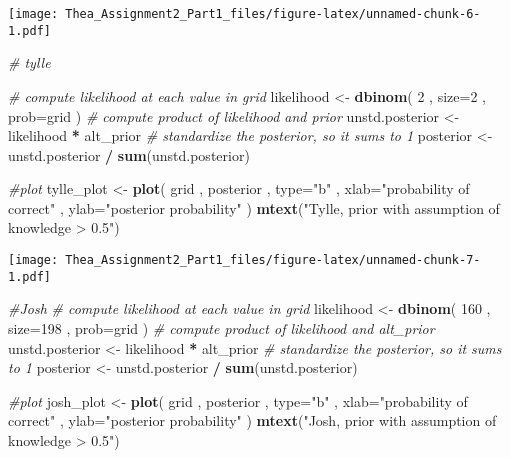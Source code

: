 \documentclass[]{article}
\newenvironment{Shaded}{\begin{snugshade}}{\end{snugshade}}
\newcommand{\KeywordTok}[1]{\textcolor[rgb]{0.13,0.29,0.53}{\textbf{#1}}}
\newcommand{\DataTypeTok}[1]{\textcolor[rgb]{0.13,0.29,0.53}{#1}}
\newcommand{\DecValTok}[1]{\textcolor[rgb]{0.00,0.00,0.81}{#1}}
\newcommand{\StringTok}[1]{\textcolor[rgb]{0.31,0.60,0.02}{#1}}
\newcommand{\CommentTok}[1]{\textcolor[rgb]{0.56,0.35,0.01}{\textit{#1}}}
\newcommand{\OperatorTok}[1]{\textcolor[rgb]{0.81,0.36,0.00}{\textbf{#1}}}
\newcommand{\NormalTok}[1]{#1}
\begin{document}
\texttt{[image: Thea\_Assignment2\_Part1\_files/figure-latex/unnamed-chunk-6-1.pdf]}

\begin{Shaded}
\begin{Highlighting}[]
\CommentTok{# tylle}

\CommentTok{# compute likelihood at each value in grid}
\NormalTok{likelihood <-}\StringTok{ }\KeywordTok{dbinom}\NormalTok{( }\DecValTok{2}\NormalTok{ , }\DataTypeTok{size=}\DecValTok{2}\NormalTok{ , }\DataTypeTok{prob=}\NormalTok{grid )}
\CommentTok{# compute product of likelihood and prior}
\NormalTok{unstd.posterior <-}\StringTok{ }\NormalTok{likelihood }\OperatorTok{*}\StringTok{ }\NormalTok{alt_prior}
\CommentTok{# standardize the posterior, so it sums to 1}
\NormalTok{posterior <-}\StringTok{ }\NormalTok{unstd.posterior }\OperatorTok{/}\StringTok{ }\KeywordTok{sum}\NormalTok{(unstd.posterior)}

\CommentTok{#plot}
\NormalTok{tylle_plot <-}\StringTok{ }\KeywordTok{plot}\NormalTok{( grid , posterior , }\DataTypeTok{type=}\StringTok{"b"}\NormalTok{ ,}
    \DataTypeTok{xlab=}\StringTok{"probability of correct"}\NormalTok{ , }\DataTypeTok{ylab=}\StringTok{"posterior probability"}\NormalTok{ )}
\KeywordTok{mtext}\NormalTok{(}\StringTok{"Tylle, prior with assumption of knowledge > 0.5"}\NormalTok{)}
\end{Highlighting}
\end{Shaded}

\texttt{[image: Thea\_Assignment2\_Part1\_files/figure-latex/unnamed-chunk-7-1.pdf]}

\begin{Shaded}
\begin{Highlighting}[]
\CommentTok{#Josh}
\CommentTok{# compute likelihood at each value in grid}
\NormalTok{likelihood <-}\StringTok{ }\KeywordTok{dbinom}\NormalTok{( }\DecValTok{160}\NormalTok{ , }\DataTypeTok{size=}\DecValTok{198}\NormalTok{ , }\DataTypeTok{prob=}\NormalTok{grid )}
\CommentTok{# compute product of likelihood and alt_prior}
\NormalTok{unstd.posterior <-}\StringTok{ }\NormalTok{likelihood }\OperatorTok{*}\StringTok{ }\NormalTok{alt_prior}
\CommentTok{# standardize the posterior, so it sums to 1}
\NormalTok{posterior <-}\StringTok{ }\NormalTok{unstd.posterior }\OperatorTok{/}\StringTok{ }\KeywordTok{sum}\NormalTok{(unstd.posterior)}

\CommentTok{#plot}
\NormalTok{josh_plot <-}\StringTok{ }\KeywordTok{plot}\NormalTok{( grid , posterior , }\DataTypeTok{type=}\StringTok{"b"}\NormalTok{ ,}
    \DataTypeTok{xlab=}\StringTok{"probability of correct"}\NormalTok{ , }\DataTypeTok{ylab=}\StringTok{"posterior probability"}\NormalTok{ )}
\KeywordTok{mtext}\NormalTok{(}\StringTok{"Josh, prior with assumption of knowledge > 0.5"}\NormalTok{)}
\end{Highlighting}
\end{Shaded}
\end{document}
